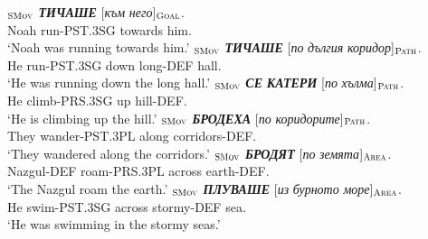 \documentclass[output=paper,colorlinks,citecolor=brown]{langscibook}
\begin{document}
\begin{exe}
\ex \label{ex:09}
$_{\text{\textsc{SMov}}}$ \textit{\textbf{ТИЧАШЕ}} [\textit{към} \textit{него}]$_{\text{\textsc{Goal}}}$. \\
Noah run-PST.3SG towards him. \\
\glt `Noah was running towards him.' 
\ex \label{ex:10}
$_{\text{\textsc{SMov}}}$ \textit{\textbf{ТИЧАШЕ}} [\textit{по} \textit{дългия} \textit{коридор}]$_{\text{\textsc{Path}}}$.\\
He run-PST.3SG down long-DEF hall. \\
\glt `He was running down the long hall.' 
\ex \label{ex:11}
$_{\text{\textsc{SMov}}}$ {\textit{\textbf{СЕ}} \textit{\textbf{КАТЕРИ}}} 
 [\textit{по} \textit{хълма}]$_{\text{\textsc{Path}}}$.\\
He climb-PRS.3SG up hill-DEF. \\
\glt `He is climbing up the hill.'
\ex \label{ex:12}
\gll [\textit{Те}]$_{\text{\textsc{SMov}}}$ \textit{\textbf{БРОДЕХА}} [\textit{по} \textit{коридорите}]$_{\text{\textsc{Path}}}$.\\
They wander-PST.3PL along corridors-DEF. \\
\glt `They wandered along the corridors.' 
\ex \label{ex:13}
$_{\text{\textsc{SMov}}}$ \textit{\textbf{БРОДЯТ}} [\textit{по} \textit{земята}]$_{\text{\textsc{Area}}}$.\\
Nazgul-DEF roam-PRS.3PL across earth-DEF. \\
\glt `The Nazgul roam the earth.'
\ex \label{ex:14}
$_{\text{\textsc{SMov}}}$ \textit{\textbf{ПЛУВАШЕ}} [\textit{из} \textit{бурното} \textit{море}]$_{\text{\textsc{Area}}}$. \\
He swim-PST.3SG across stormy-DEF sea. \\
\glt `He was swimming in the stormy seas.'
\end{exe}
\end{document}
